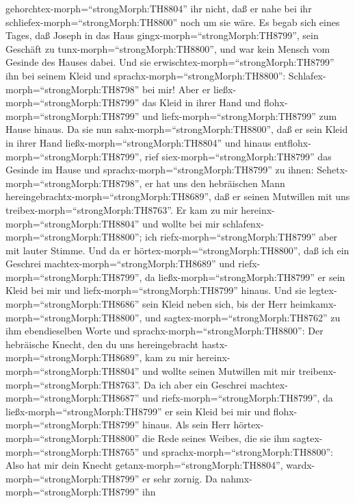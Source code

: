 gehorchtex-morph=``strongMorph:TH8804'' ihr nicht, daß er nahe bei ihr
schliefex-morph=``strongMorph:TH8800'' noch um sie wäre. 
Es begab sich eines Tages, daß Joseph in das Haus
gingx-morph=``strongMorph:TH8799'', sein Geschäft zu
tunx-morph=``strongMorph:TH8800'', und war kein Mensch vom Gesinde des
Hauses dabei.  Und sie
erwischtex-morph=``strongMorph:TH8799'' ihn bei seinem Kleid und
sprachx-morph=``strongMorph:TH8800'':
Schlafex-morph=``strongMorph:TH8798'' bei mir! Aber er
ließx-morph=``strongMorph:TH8799'' das Kleid in ihrer Hand und
flohx-morph=``strongMorph:TH8799'' und
liefx-morph=``strongMorph:TH8799'' zum Hause hinaus.  Da
sie nun sahx-morph=``strongMorph:TH8800'', daß er sein Kleid in ihrer
Hand ließx-morph=``strongMorph:TH8804'' und hinaus
entflohx-morph=``strongMorph:TH8799'',  rief
siex-morph=``strongMorph:TH8799'' das Gesinde im Hause und
sprachx-morph=``strongMorph:TH8799'' zu ihnen:
Sehetx-morph=``strongMorph:TH8798'', er hat uns den hebräischen Mann
hereingebrachtx-morph=``strongMorph:TH8689'', daß er seinen Mutwillen
mit uns treibex-morph=``strongMorph:TH8763''. Er kam zu mir
hereinx-morph=``strongMorph:TH8804'' und wollte bei mir
schlafenx-morph=``strongMorph:TH8800''; ich
riefx-morph=``strongMorph:TH8799'' aber mit lauter Stimme. 
Und da er hörtex-morph=``strongMorph:TH8800'', daß ich ein Geschrei
machtex-morph=``strongMorph:TH8689'' und
riefx-morph=``strongMorph:TH8799'', da
ließx-morph=``strongMorph:TH8799'' er sein Kleid bei mir und
liefx-morph=``strongMorph:TH8799'' hinaus.  Und sie
legtex-morph=``strongMorph:TH8686'' sein Kleid neben sich, bis der Herr
heimkamx-morph=``strongMorph:TH8800'',  und
sagtex-morph=``strongMorph:TH8762'' zu ihm ebendieselben Worte und
sprachx-morph=``strongMorph:TH8800'': Der hebräische Knecht, den du uns
hereingebracht hastx-morph=``strongMorph:TH8689'', kam zu mir
hereinx-morph=``strongMorph:TH8804'' und wollte seinen Mutwillen mit mir
treibenx-morph=``strongMorph:TH8763''.  Da ich aber ein
Geschrei machtex-morph=``strongMorph:TH8687'' und
riefx-morph=``strongMorph:TH8799'', da
ließx-morph=``strongMorph:TH8799'' er sein Kleid bei mir und
flohx-morph=``strongMorph:TH8799'' hinaus.  Als sein Herr
hörtex-morph=``strongMorph:TH8800'' die Rede seines Weibes, die sie ihm
sagtex-morph=``strongMorph:TH8765'' und
sprachx-morph=``strongMorph:TH8800'': Also hat mir dein Knecht
getanx-morph=``strongMorph:TH8804'', wardx-morph=``strongMorph:TH8799''
er sehr zornig.  Da nahmx-morph=``strongMorph:TH8799'' ihn
